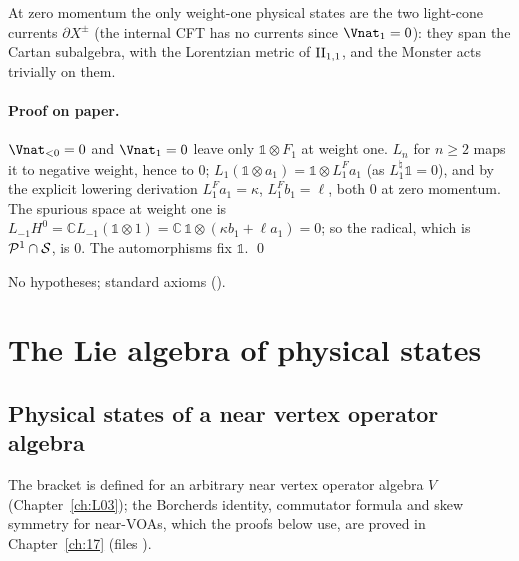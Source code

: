 \begin{physics}
At zero momentum the only weight-one physical states are the two light-cone currents $\partial X^\pm$
(the internal CFT has no currents since $\Vnat_1=0$): they span the Cartan subalgebra, with the
Lorentzian metric of $\mathrm{II}_{1,1}$, and the Monster acts trivially on them.
\end{physics}
\paragraph{Proof on paper.}  $\Vnat_{<0}=0$ and $\Vnat_1=0$ leave only $\mathbb 1\otimes F_1$ at weight one.  $L_n$ for $n\ge2$
maps it to negative weight, hence to $0$; $L_1(\mathbb 1\otimes a_1)=\mathbb 1\otimes L^F_1a_1$ (as $L^\natural_1\mathbb 1=0$), and by the explicit lowering derivation
$L^F_1a_1=\kappa$, $L^F_1b_1=\ell$, both $0$ at zero momentum.  The spurious space at weight
one is $L_{-1}H^0=\mathbb C L_{-1}(\mathbb 1\otimes1)=\mathbb C\,\mathbb 1\otimes(\kappa b_1+\ell a_1)=0$; so the radical, which is
$\mathcal{P}^1\cap\mathcal{S}$, is $0$.  The automorphisms fix $\mathbb 1$. \qed
\begin{status}No hypotheses; standard axioms ().\end{status}

\section{The Lie algebra of physical states}\label{ch18:sec:lie}

\subsection{Physical states of a near vertex operator algebra}

The bracket is defined for an arbitrary near vertex operator algebra $V$ (Chapter~\ref{ch:L03}); the Borcherds
identity, commutator formula and skew symmetry for near-VOAs, which the proofs below use, are proved in
Chapter~\ref{ch:17} (files ).

